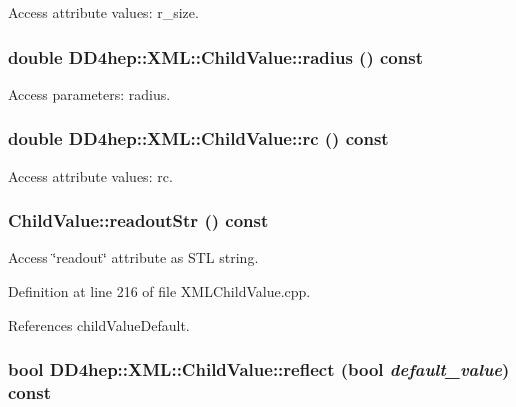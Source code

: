Access attribute values: r\_\-size. \hypertarget{struct_d_d4hep_1_1_x_m_l_1_1_child_value_a9deeef965fae4b2e98936dc0693405d6}{
\subsubsection[{radius}]{\setlength{\rightskip}{0pt plus 5cm}double DD4hep::XML::ChildValue::radius () const}}
\label{struct_d_d4hep_1_1_x_m_l_1_1_child_value_a9deeef965fae4b2e98936dc0693405d6}


Access parameters: radius. \hypertarget{struct_d_d4hep_1_1_x_m_l_1_1_child_value_a1d2342902e203600ef7293ead40ff2f7}{
\subsubsection[{rc}]{\setlength{\rightskip}{0pt plus 5cm}double DD4hep::XML::ChildValue::rc () const}}
\label{struct_d_d4hep_1_1_x_m_l_1_1_child_value_a1d2342902e203600ef7293ead40ff2f7}


Access attribute values: rc. \hypertarget{struct_d_d4hep_1_1_x_m_l_1_1_child_value_af46ff62859f4902bd9f80aa78080a8d7}{
\subsubsection[{readoutStr}]{ ChildValue::readoutStr () const}}
\label{struct_d_d4hep_1_1_x_m_l_1_1_child_value_af46ff62859f4902bd9f80aa78080a8d7}


Access \char`\"{}readout\char`\"{} attribute as STL string. 

Definition at line 216 of file XMLChildValue.cpp.

References childValueDefault.\hypertarget{struct_d_d4hep_1_1_x_m_l_1_1_child_value_a2a33f9b124b7e7b34ba6249120904e08}{
\subsubsection[{reflect}]{\setlength{\rightskip}{0pt plus 5cm}bool DD4hep::XML::ChildValue::reflect (bool {\em default\_\-value}) const}}
\label{struct_d_d4hep_1_1_x_m_l_1_1_child_value_a2a33f9b124b7e7b34ba6249120904e08}


